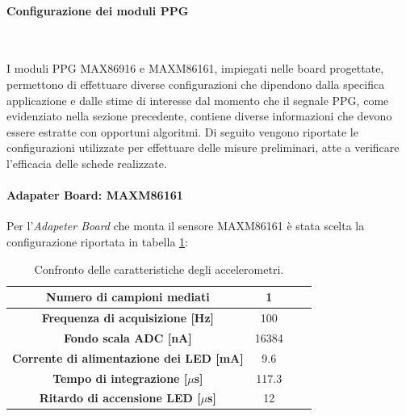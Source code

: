 \paragraph{Configurazione dei moduli PPG}~

\noindent I moduli PPG MAX86916 e MAXM86161, impiegati nelle board progettate, permettono di effettuare diverse configurazioni che dipendono dalla specifica applicazione e dalle stime di interesse dal momento che il segnale PPG, come evidenziato nella sezione precedente, contiene diverse informazioni che devono essere estratte con opportuni algoritmi. Di seguito vengono riportate le configurazioni utilizzate per effettuare delle misure preliminari, atte a verificare l'efficacia delle schede realizzate.

\paragraph{Adapater Board: MAXM86161}
Per l'\textit{Adapeter Board} che monta il sensore MAXM86161 è stata scelta la configurazione riportata in tabella \ref{tab:ConfigMAXM86161}:
\begin{table}[h]
	\renewcommand{\arraystretch}{1.5}
	\centering
	\footnotesize
	\begin{tabular}{cccc}
		\textbf{Numero di campioni mediati} & 1 \\ \hline
		\textbf{Frequenza di acquisizione [Hz]} & 100 \\ \hline
		\textbf{Fondo scala ADC [nA]} & 16384 \\ \hline
		\textbf{Corrente di alimentazione dei LED [mA]} & 9.6 \\ \hline
		\textbf{Tempo di integrazione [$\mu$s]} & 117.3 \\ \hline
		\textbf{Ritardo di accensione LED [$\mu$s]} & 12 \\ \hline
	\end{tabular}
	\caption{Confronto delle caratteristiche degli accelerometri.}
	\label{tab:ConfigMAXM86161}
\end{table}
